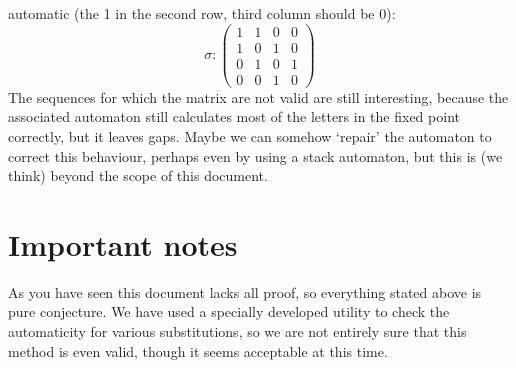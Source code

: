 \documentclass{article}
\begin{document}
automatic (the 1 in the second row, third column should be 0):
\begin{displaymath}
\sigma: \left( \begin{array}{cccc}
1 & 1 & 0 & 0 \\
1 & 0 & 1 & 0 \\
0 & 1 & 0 & 1 \\
0 & 0 & 1 & 0
\end{array} \right)
\end{displaymath}
The sequences for which the matrix are not valid are still interesting, because
the associated automaton still calculates most of the letters in the fixed
point correctly, but it leaves gaps.
Maybe we can somehow `repair' the automaton to correct this behaviour, 
perhaps even by using a stack automaton, but this is (we think) beyond the
scope of this document.

\section*{Important notes}
As you have seen this document lacks all proof, so everything stated above
is pure conjecture. We have used a specially developed utility to check the
automaticity for various substitutions, so we are not entirely sure that
this method is even valid, though it seems acceptable at this time.

\end{document}
